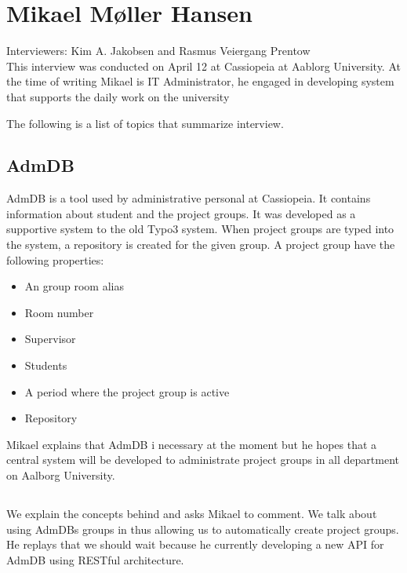 
\section{Mikael Møller Hansen}
\label{sec:mikael}
Interviewers: Kim A. Jakobsen and Rasmus Veiergang Prentow\\

This interview was conducted on April 12\ths{} at Cassiopeia at Aablorg University.
At the time of writing Mikael is IT Administrator, he engaged in developing system that supports the daily work on the university

The following is a list of topics that summarize interview.

\subsection*{AdmDB}
AdmDB is a tool used by administrative personal at Cassiopeia. It contains information about student and the project groups.
It was developed as a supportive system to the old Typo3 system. When project groups are typed into the system, a repository is created for the given group. A project group have the following properties:
\begin{itemize}
	\item An group room alias
	\item Room number
	\item Supervisor
	\item Students
	\item A period where the project group is active
	\item Repository
\end{itemize}

Mikael explains that AdmDB i necessary at the moment but he hopes that a central system will be developed to administrate project groups in all department on Aalborg University. 

\subsection*{\system{}}
We explain the concepts behind \system{} and asks Mikael to comment. 
We talk about using AdmDBs groups in \system{} thus allowing us to automatically create project groups. 
He replays that we should wait because he currently developing a new API for AdmDB using RESTful architecture. 
